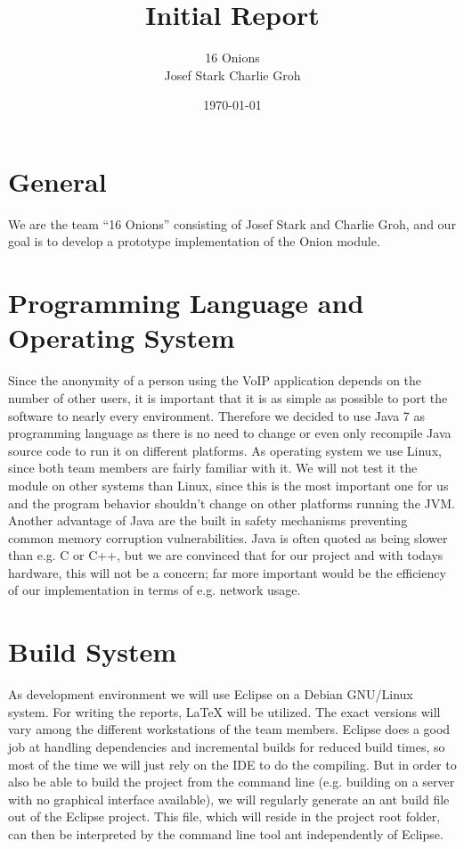 \documentclass{article}
\begin{document}
\title{\Huge Initial Report \normalsize}
\date{\today}
\author{\LARGE 16 Onions \normalsize \\[5pt] Josef Stark \hspace{20pt} Charlie Groh}
\maketitle
\let\thefootnote\relax{}

\section{General}
We are the team ``16 Onions'' consisting of Josef Stark and Charlie Groh,
and our goal is to develop a prototype implementation of the Onion module.

\section{Programming Language and Operating System}
Since the anonymity of a person using the VoIP application depends on the
number of other users, it is important that it is as simple as possible to port
the software to nearly every environment. Therefore we decided to use Java 7
as programming language as there is no need to change or even only recompile Java source code to run it on different platforms. As operating system we use Linux, since both team members are fairly familiar with it. We will not
test it the module on other systems than Linux, since this is the most important one for us and the program behavior shouldn't change on other platforms running the JVM. Another advantage of Java are the built in safety mechanisms preventing common memory corruption vulnerabilities. 
Java is often quoted as being slower than e.g. C or C++, but we are convinced that for our project and with todays hardware, this will not be a concern; far more important would be the efficiency of our implementation in terms of e.g. network usage.

\section{Build System}
As development environment we will use Eclipse on a Debian GNU/Linux system. For
writing the reports, LaTeX will be utilized. The exact versions will vary among
the different workstations of the team members.
Eclipse does a good job at handling dependencies and incremental builds for reduced build times, so most of the time we will just rely on the IDE to do the compiling. But in order to also be able to build the project from the command line (e.g. building on a server with no graphical interface available), we will regularly generate an ant build file out of the Eclipse project. This file, which will reside in the project root folder, can then be interpreted by the command line tool ant independently of Eclipse.
\end{document}
